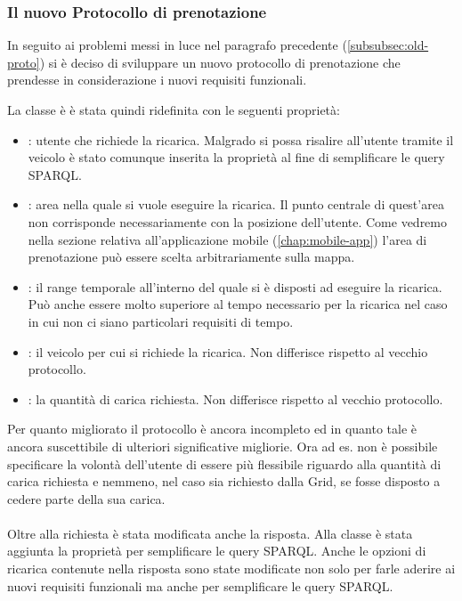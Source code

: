 \subsubsection{Il nuovo Protocollo di prenotazione}\label{subsubsec:chargerequest}

In seguito ai problemi messi in luce nel paragrafo precedente (\ref{subsubsec:old-proto}) si è deciso di sviluppare un nuovo protocollo di prenotazione che prendesse in considerazione i nuovi requisiti funzionali.

La classe è  è stata quindi ridefinita con le seguenti proprietà:

\begin{itemize}
	\item {}: utente che richiede la ricarica. Malgrado si possa risalire all'utente tramite il veicolo è stato comunque inserita la proprietà al fine di semplificare le query SPARQL.
	\item {}: area nella quale si vuole eseguire la ricarica. Il punto centrale di quest'area non corrisponde necessariamente con la posizione dell'utente. Come vedremo nella sezione relativa all'applicazione mobile (\ref{chap:mobile-app}) l'area di prenotazione può essere scelta arbitrariamente sulla mappa.
	\item {}: il range temporale all'interno del quale si è disposti ad eseguire la ricarica. Può anche essere molto superiore al tempo necessario per la ricarica nel caso in cui non ci siano particolari requisiti di tempo.
	\item {}: il veicolo per cui si richiede la ricarica. Non differisce rispetto al vecchio protocollo.
	\item {}: la quantità di carica richiesta. Non differisce rispetto al vecchio protocollo.
\end{itemize}

\noindent
Per quanto migliorato il protocollo è ancora incompleto ed in quanto tale è ancora suscettibile di ulteriori significative migliorie. Ora ad es. non è possibile specificare la volontà dell'utente di essere più flessibile riguardo alla quantità di carica richiesta e nemmeno, nel caso sia richiesto dalla Grid, se fosse disposto a cedere parte della sua carica.
\\ \\
Oltre alla richiesta è stata modificata anche la risposta. Alla classe  è stata aggiunta la proprietà  per semplificare le query SPARQL. Anche le opzioni di ricarica contenute nella risposta sono state modificate non solo per farle aderire ai nuovi requisiti funzionali ma anche per semplificare le query SPARQL.


